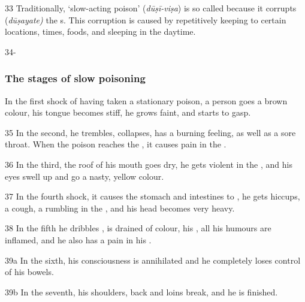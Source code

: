 \begin{translation}
    
    \item[33]
    Traditionally, `slow-acting poison' (\emph{dūṣī-viṣa}) is so called because
    it corrupts (\emph{dūṣayate)} the s.  This
    corruption is caused by repetitively keeping to certain locations, times,
    foods, and sleeping in the daytime.
    
    \item[34-]
    \subsubsection{The stages of slow poisoning}
    In the first shock of having taken a stationary poison, a person goes a
    brown colour, his tongue becomes stiff, he grows faint, and starts to gasp.
    \item[35]
    In the second, he trembles, collapses, has a burning feeling, as well as a
    sore throat.  When the poison reaches the , it causes
    pain in the .
    \item[36]
    In the third, the roof of his mouth goes dry, he gets violent  in the , and his eyes swell up and go 
        a
    nasty, yellow colour.
    \item[37]
    In the fourth shock, it causes the stomach and intestines to
    , he gets hiccups, a cough,  a rumbling in the
    , and his head becomes very heavy.
    \item[38]
    In the fifth he dribbles , is drained of colour,
    his ,  all his humours are inflamed, and he
    also has a pain in his .
    \item[39a]
    In the sixth, his consciousness is annihilated and he completely loses
    control of his bowels.
    \item[39b]
    In the seventh, his shoulders, back and loins break, and he is finished.
    
    

\end{translation}
